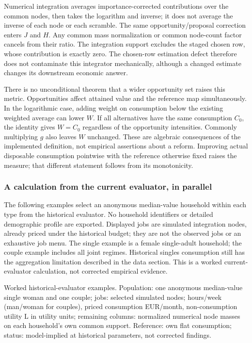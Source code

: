 \documentclass[11pt,a4paper]{article}
\begin{document}
Numerical integration averages importance-corrected contributions over the common nodes, then takes the logarithm and inverse; it does not average the inverse of each node or each scramble. The same opportunity/proposal correction enters \(J\) and \(H\). Any common mass normalization or common node-count factor cancels from their ratio. The integration support excludes the staged chosen row, whose contribution is exactly zero. The chosen-row estimation defect therefore does not contaminate this integrator mechanically, although a changed estimate changes its downstream economic answer.

There is no unconditional theorem that a wider opportunity set raises this metric. Opportunities affect attained value and the reference map simultaneously. In the logarithmic case, adding weight on consumption below the existing weighted average can lower \(W\). If all alternatives have the same consumption \(C_0\), the identity gives \(W=C_0\) regardless of the opportunity intensities. Commonly multiplying \(g\) also leaves \(W\) unchanged. These are algebraic consequences of the implemented definition, not empirical assertions about a reform. Improving actual disposable consumption pointwise with the reference otherwise fixed raises the measure; that different statement follows from its monotonicity.

\subsubsection{A calculation from the current evaluator, in parallel}\label{a-calculation-from-the-current-evaluator-in-parallel}

The following examples select an anonymous median-value household within each type from the historical evaluator. No household identifiers or detailed demographic profile are exported. Displayed jobs are simulated integration nodes, already priced under the historical budget; they are not the observed jobs or an exhaustive job menu. The single example is a female single-adult household; the couple example includes all joint regimes. Historical singles consumption still has the aggregation limitation described in the data section. This is a worked current-evaluator calculation, not corrected empirical evidence.

Worked historical-evaluator examples. Population: one anonymous median-value single woman and one couple; jobs: selected simulated nodes; hours/week (man/woman for couples), priced consumption EUR/month, non-consumption utility L in utility units; remaining columns: normalized numerical node masses on each household's own common support. Reference: own flat consumption; status: model-implied at historical parameters, not corrected findings.
\end{document}
